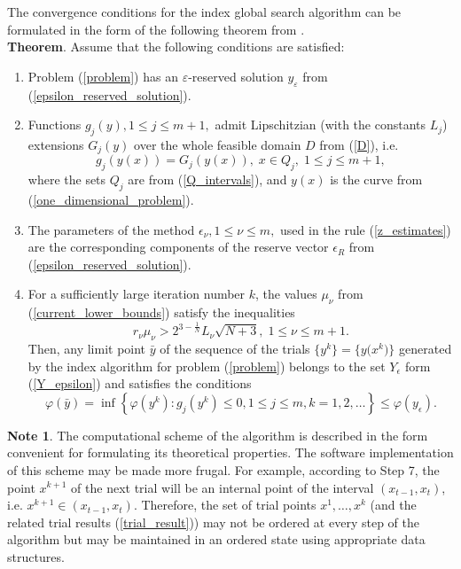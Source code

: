 \documentclass[preprint]{elsarticle}
\begin{document}
	The convergence conditions for the index global search algorithm can be formulated in the form of the following theorem from \cite{Strongin2000}. 
\\
\textbf{Theorem}. Assume that the following conditions are satisfied:
\begin{enumerate} 
  \item Problem (\ref{problem}) has an $\varepsilon$-reserved solution $y_{\varepsilon}$ from (\ref{epsilon_reserved_solution}).
  \item Functions $g_j(y), 1 \leq j \leq m+1,$ admit Lipschitzian (with the constants $L_j$) extensions $G_{j}(y)$ over the whole feasible domain $D$ from (\ref{D}), i.e.
$$
	g_j \left( y(x) \right) = G_j \left( y(x) \right), \; x \in Q_j, \; 1 \leq j \leq m+1,
$$
where the sets $Q_j$ are from (\ref{Q_intervals}), and $y(x)$ is the curve from (\ref{one_dimensional_problem}).
	\item The parameters of the method $\epsilon_{\nu}, 1 \leq \nu \leq m,$ used in the rule (\ref{z_estimates}) are the corresponding components of the reserve vector $\epsilon_{R}$ from (\ref{epsilon_reserved_solution}).
	\item For a sufficiently large iteration number $k$, the values $\mu_{\nu}$ from (\ref{current_lower_bounds}) satisfy the inequalities
		\begin{equation}\label{theorem_inequalities}
			r_{\nu}\mu_{\nu} > 2^{3-\frac{1}{N}}L_{\nu}\sqrt{N+3}, \; 1 \leq \nu \leq m+1. 
		\end{equation}
Then, any limit point $\bar{y}$ of the sequence of the trials $\{y^k\}=\big\{y\big(x^k\big)\big\}$ generated by the index algorithm for problem (\ref{problem}) belongs to the set $Y_{\epsilon}$ form (\ref{Y_epsilon}) and satisfies the conditions	
$$
	\varphi(\bar y) = \inf\left\{\varphi(y^k):g_j(y^k) \leq 0, 1 \leq j \leq m, k = 1,2,\ldots \right\} \leq \varphi(y_{\epsilon}).
$$
\end{enumerate}
\textbf{Note 1}. The computational scheme of the algorithm is described in the form convenient for  formulating its theoretical properties. The software implementation of this scheme may be made more frugal. For example, according to Step 7, the point $x^{k+1}$ of the next trial will be an internal point of the interval $(x_{t-1}, x_t)$, i.e. $x^{k+1} \in (x_{t-1}, x_t)$. Therefore, the set of trial points $x^1,\ldots, x^k$ (and the related trial results (\ref{trial_result})) may not be ordered  at every step of the algorithm but may be maintained in an ordered state using appropriate data structures.
\end{document}

